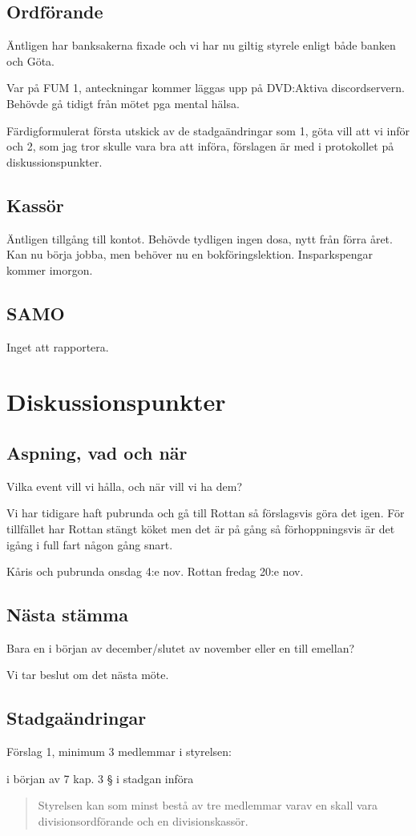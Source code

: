 \documentclass[protokoll]{dvd}
\begin{document}
\subsection{Ordförande}
Äntligen har banksakerna fixade och vi har nu giltig styrele enligt både banken och Göta. 

Var på FUM 1, anteckningar kommer läggas upp på DVD:Aktiva discordservern. Behövde gå tidigt från mötet pga mental hälsa. 

Färdigformulerat första utskick av de stadgaändringar som 1, göta vill att vi inför och 2, som jag tror skulle vara bra att införa, förslagen är med i protokollet på diskussionspunkter. 

\subsection{Kassör}
Äntligen tillgång till kontot.
Behövde tydligen ingen dosa, nytt från förra året. Kan nu börja jobba, men behöver nu en bokföringslektion. Insparkspengar kommer imorgon. 

\subsection{SAMO}
Inget att rapportera. 


\newpage


\section{Diskussionspunkter}
\subsection{Aspning, vad och när}
Vilka event vill vi hålla, och när vill vi ha dem?

Vi har tidigare haft pubrunda och gå till Rottan så förslagsvis göra det igen. För tillfället har Rottan stängt köket men det är på gång så förhoppningsvis är det igång i full fart någon gång snart. 

Kåris och pubrunda onsdag 4:e nov. 
Rottan fredag 20:e nov. 

\subsection{Nästa stämma}
Bara en i början av december/slutet av november eller en till emellan?

Vi tar beslut om det nästa möte. 

\subsection{Stadgaändringar}
Förslag 1, minimum 3 medlemmar i styrelsen: 
\begin{attsatser}
    \item i början av 7 kap. 3 § i stadgan införa 
    \begin{quote}
        Styrelsen kan som minst bestå av tre medlemmar varav en skall vara divisionsordförande och en divisionskassör. 
    \end{quote}
\end{attsatser}
\end{document}
